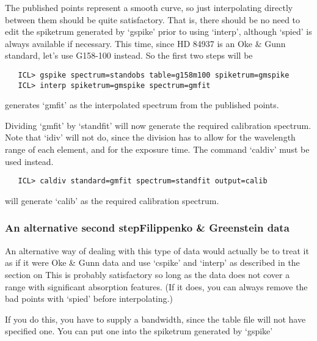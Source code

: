    The published points represent a smooth curve, so just interpolating
   directly between them should be quite satisfactory.  That is, there
   should be no need to edit the spiketrum generated by `gspike' prior
   to using `interp', although `spied' is always available if necessary.
   This time, since HD 84937 is an Oke \& Gunn standard, let's use
   G158-100 instead.  So the first two steps will be

\begin{verbatim}
   ICL> gspike spectrum=standobs table=g158m100 spiketrum=gmspike
   ICL> interp spiketrum=gmspike spectrum=gmfit
\end{verbatim}

   generates `gmfit' as the interpolated spectrum from the published
   points.

   Dividing `gmfit' by `standfit' will now generate the required
   calibration spectrum.  Note that `idiv' will not do, since the
   division has to allow for the wavelength range of each element, and
   for the exposure time.  The command `caldiv' must be used instead.

\begin{verbatim}
   ICL> caldiv standard=gmfit spectrum=standfit output=calib
\end{verbatim}

   will generate `calib' as the required calibration spectrum.


\subsubsection{\label{techno5fgsecalt}An alternative second
   step\latorhtm{---}{-}Filippenko \& Greenstein data}

   An alternative way of dealing with this type of data would actually
   be to treat it as if it were Oke \& Gunn data and use `cspike' and
   `interp' as described in
   {the section on }
   This is probably satisfactory so long as the data does not cover a
   range with significant absorption features.  (If it does, you can
   always remove the bad points with `spied' before interpolating.)

   If you do this, you have to supply a bandwidth, since the table file
   will not have specified one.  You can put one into the spiketrum
   generated by `gspike'
   {}

